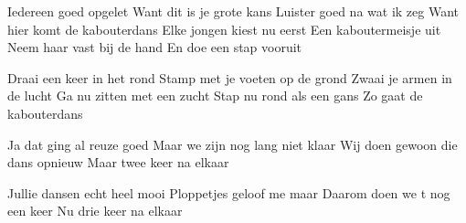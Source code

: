 \begin{verse*}
Iedereen goed opgelet
Want dit is je grote kans
Luister goed na wat ik zeg
Want hier komt de kabouterdans
Elke jongen kiest nu eerst
Een kaboutermeisje uit
Neem haar vast bij de hand
En doe een stap vooruit
\end{verse*}

\begin{chorus}
Draai een keer in het rond
Stamp met je voeten op de grond
Zwaai je armen in de lucht
Ga nu zitten met een zucht
Stap nu rond als een gans
Zo gaat de kabouterdans
\end{chorus}

\begin{verse*}
Ja dat ging al reuze goed
Maar we zijn nog lang niet klaar
Wij doen gewoon die dans opnieuw
Maar twee keer na elkaar
\end{verse*}

\thechorus[2]

\begin{verse*}
Jullie dansen echt heel mooi
Ploppetjes geloof me maar
Daarom doen we t nog een keer
Nu drie keer na elkaar
\end{verse*}

\thechorus[3]
